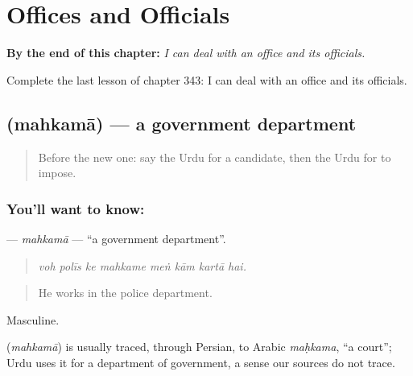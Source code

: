
\chapter{Offices and Officials}
\label{ch:ur-offices-and-officials}

\begin{chapteropening}
\textbf{By the end of this chapter:} \emph{I can deal with an office and its officials.}

Complete the last lesson of chapter 343: I can deal with an office and its officials.
\end{chapteropening}

\section[\texorpdfstring{\ur{محکمہ} (mahkamā)}{محکمہ (mahkamā)}]{ (mahkamā) — a government department}

\label{lesson:UR-C343-mahkama}



\begin{quote}
Before the new one: say the Urdu for a candidate, then the Urdu for to impose.
\end{quote}

\subsection*{You'll want to know: }
\textbf{} — \emph{mahkamā} — \textquotedblleft{}a government department\textquotedblright{}.

\begin{quote}
       
\end{quote}

\begin{quote}
\emph{voh polīs ke mahkame meṅ kām kartā hai.}
\end{quote}

\begin{quote}
He works in the police department.
\end{quote}

Masculine.

\begin{cousinweb}
\textbf{} (\emph{mahkamā}) is usually traced, through Persian, to Arabic \emph{maḥkama}, \textquotedblleft{}a court\textquotedblright{}; Urdu uses it for a department of government, a sense our sources do not trace.
\end{cousinweb}


